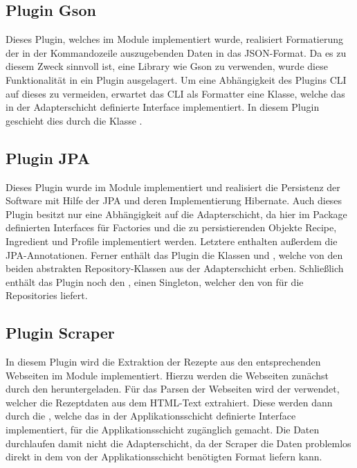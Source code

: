 \subsection{Plugin Gson}
Dieses Plugin, welches im Module \href{https://github.com/anditru/quickie/tree/bb41442c7f1ffbfcd3117cd86a40f7932e543a33/0-quickie-plugin-gson}{} implementiert wurde, realisiert Formatierung der in der Kommandozeile auszugebenden Daten in das JSON-Format. Da es zu diesem Zweck sinnvoll ist, eine Library wie Gson zu verwenden, wurde diese Funktionalität in ein Plugin ausgelagert. Um eine Abhängigkeit des Plugins \acs{CLI} auf dieses zu vermeiden, erwartet das \ac{CLI} als Formatter eine Klasse, welche das in der Adapterschicht definierte Interface  implementiert. In diesem Plugin geschieht dies durch die Klasse .

\subsection{Plugin JPA}
Dieses Plugin wurde im Module \href{https://github.com/anditru/quickie/tree/bb41442c7f1ffbfcd3117cd86a40f7932e543a33/0-quickie-plugin-jpa}{} implementiert und realisiert die Persistenz der Software mit Hilfe der \ac{JPA} und deren Implementierung Hibernate. Auch dieses Plugin besitzt nur eine Abhängigkeit auf die Adapterschicht, da hier im Package \href{https://github.com/anditru/quickie/tree/bb41442c7f1ffbfcd3117cd86a40f7932e543a33/1-quickie-adapters/src/main/java/org/pinkcrazyunicorn/quickie/adapters/persistence}{} definierten Interfaces für Factories und die zu persistierenden Objekte Recipe, Ingredient und Profile implementiert werden. Letztere enthalten außerdem die \ac{JPA}-Annotationen. Ferner enthält das Plugin die Klassen  und , welche von den beiden abstrakten Repository-Klassen aus der Adapterschicht erben. Schließlich enthält das Plugin noch den , einen Singleton, welcher den  von  für die Repositories liefert.

\subsection{Plugin Scraper}
In diesem Plugin wird die Extraktion der Rezepte aus den entsprechenden Webseiten im Module \href{https://github.com/anditru/quickie/tree/bb41442c7f1ffbfcd3117cd86a40f7932e543a33/0-quickie-plugin-scraper}{} implementiert. Hierzu werden die Webseiten zunächst durch den  heruntergeladen. Für das Parsen der Webseiten wird der  verwendet, welcher die Rezeptdaten aus dem HTML-Text extrahiert. Diese werden dann durch die , welche das in der Applikationsschicht definierte Interface  implementiert, für die Applikationsschicht zugänglich gemacht. Die Daten durchlaufen damit nicht die Adapterschicht, da der Scraper die Daten problemlos direkt in dem von der Applikationsschicht benötigten Format liefern kann.

